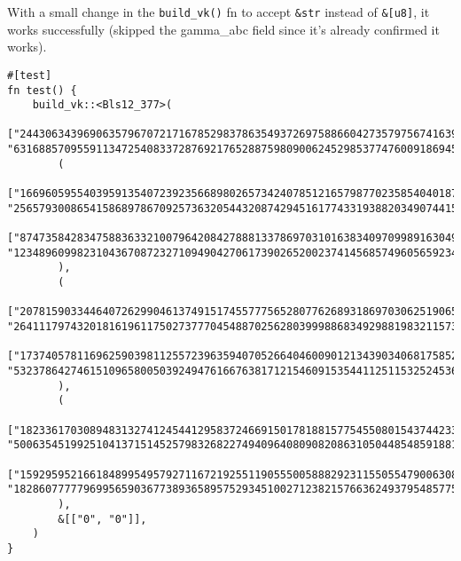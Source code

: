 \documentclass{article}
\newcommand{\inl}[1]{\lstinline{#1}}
\begin{document}
With a small change in the \inl{build_vk()} fn to accept \inl{&str} instead of \inl{&[u8]}, it works successfully (skipped the gamma_abc field since it's already confirmed it works).

\begin{lstlisting}
#[test]
fn test() {
    build_vk::<Bls12_377>(
        ["244306343969063579670721716785298378635493726975886604273579756741639953229415532528173059841495385161051909109889", "63168857095591134725408337287692176528875980900624529853774760091869452188562350014800651918572654790783920028544"],
        (
            ["166960595540395913540723923566898026573424078512165798770235854040187289225192916010951416820805112564604857674759", "256579300865415868978670925736320544320874294516177433193882034907441551828751116120797786447763257652992433074246"],
            ["87473584283475883633210079642084278881337869703101638340970998916304987007252265651123549659939971414867340710413", "123489609982310436708723271094904270617390265200237414568574960565923435716212526049371801011721780033997716837207"],
        ),
        (
            ["207815903344640726299046137491517455777565280776268931869703062519065330398931946294820126450478727867816749575328", "26411179743201816196117502737770454887025628039998868349298819832115736570578946577905207881058063637557577233081"],
            ["173740578116962590398112557239635940705266404600901213439034068175852581397457477553437876533246152293969399185346", "53237864274615109658005039249476166763817121546091535441125115325245366998581238918446431741630833736330879409260"],
        ),
        (
            ["182336170308948313274124544129583724669150178188157754550801543744233234403657037451296838109344679861568207613367", "50063545199251041371514525798326822749409640809082086310504485485918817418911777413389911727510843283856035409701"],
            ["159295952166184899549579271167219255119055500588829231155055479006308616522384365458479858992918918801397710916187", "182860777779699565903677389365895752934510027123821576636249379548577596319261062512490971767063470277595543086883"]
        ),
        &[["0", "0"]],
    )
}

\end{lstlisting}
\end{document}
